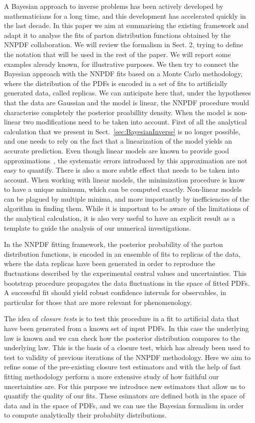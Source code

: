 A Bayesian approach to inverse problems has been actively developed by
mathematicians for a long time, and this development has accelerated quickly in
the last decade. In this paper we aim at summarising the existing framework and
adapt it to analyse the fits of parton distribution functions obtained by the
NNPDF collaboration. We will review the formalism in Sect. 2, trying to define
the notation that will be used in the rest of the paper. We will report some
examples already known, for illustrative purposes. We then try to connect the
Bayesian approach with the NNPDF fits based on a Monte Carlo methodology, where
the distribution of the PDFs is encoded in a set of fits to artificially
generated data, called replicas. We can anticipate here that, under the
hypotheses that the data are Gaussian and the model is linear, the NNPDF
procedure would characterise completely the posterior proabillity density. When
the model is non-linear two modifications need to be taken into account. First
of all the analytical calculation that we present in
Sect.~\ref{sec:BayesianInverse} is no longer possible, and one needs to rely on
the fact that a linearization of the model yields an accurate prediction. Even
though linear models are known to provide good approximations~\cite{xxx}, the
systematic errors introduced by this approximation are not easy to quantify.
There is also a more subtle effect that needs to be taken into account. When
working with linear models, the minimization procedure is know to have a unique
minimum, which can be computed exactly. Non-linear models can be plagued by
multiple minima, and more importantly by inefficiencies of the algorithm in
finding them. While it is important to be aware of the limitations of the
analytical calculation, it is also very useful to have an explicit result as a
template to guide the analysis of our numerical investigations. 

In the NNPDF fitting framework, the posterior probability of the parton
distribution functions, is encoded in an ensemble of fits to replicas of the
data, where the data replicas have been generated in order to reproduce the
fluctuations described by the experimental central values and uncertainties.
This bootstrap procedure propagates the data fluctuations in the space of fitted
PDFs. A successful fit should yield robust confidence intervals for observables,
in particular for those that are more relevant for phenomenology.

The idea of {\em closure tests} is to test this procedure in a fit to artificial
data that have been generated from a known set of input PDFs. In this case the
underlying law is known and we can check how the posterior distribution compares
to the underlying law. This is the basis of a closure test, which has already
been used to test to validity of previous iterations of the NNPDF methodology.
Here we aim to refine some of the pre-existing closure test estimators and with
the help of fast fitting methodology perform a more extensive study of how
faithful our uncertainties are. For this purpose we introduce new estimators
that allow us to quantify the quality of our fits. These esimators are defined
both in the space of data and in the space of PDFs, and we can use the Bayesian
formalism in order to compute analytically their probabiity distributions. 

